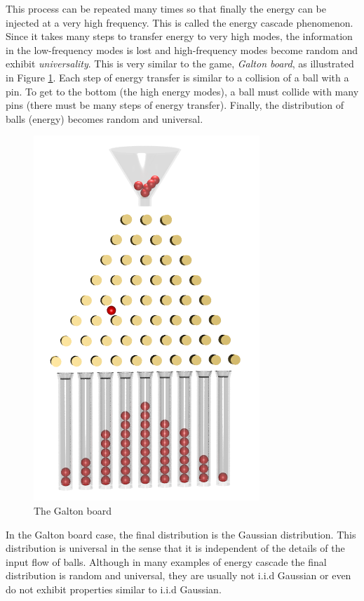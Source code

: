 This process can be repeated many times so that finally the energy can be injected at a very high frequency. 
This is called the energy cascade phenomenon. Since it takes many steps to transfer energy to very high modes, the information in the low-frequency modes is lost and high-frequency modes become random and exhibit \textit{universality}. This is very similar to the game, \textit{Galton board}, as illustrated in Figure \ref{fig.Galtonboard}.
Each step of energy transfer is similar to a collision of a ball with a pin. To get to the bottom (the high energy modes), a ball must collide with many pins (there must be many steps of energy transfer). Finally, the distribution of balls (energy) becomes random and universal.  
\begin{figure}[H]
    \centering
    \includegraphics[scale = 0.2]{introduction/Galton_board.png}
    \caption{The Galton board}
    \label{fig.Galtonboard}
\end{figure}

In the Galton board case, the final distribution is the Gaussian distribution. This distribution is universal in the sense that it is independent of the details of the input flow of balls. Although in many examples of energy cascade the final distribution is random and universal, they are usually not i.i.d Gaussian or even do not exhibit properties similar to i.i.d Gaussian.

